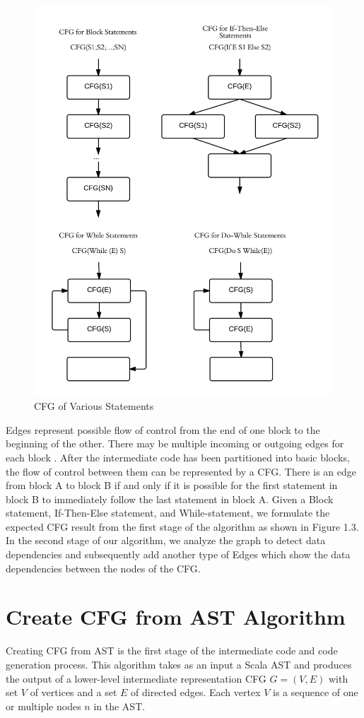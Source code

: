 \begin{figure}[h!]
\centering
\includegraphics[width=0.7\linewidth]{figures/Graph}
\caption{CFG of Various Statements}
\label{fig:Graph}
\end{figure}

Edges represent possible flow of control from the end of one block to the beginning of the other. There may be multiple incoming or outgoing edges for each block \cite{allen1970control}. After the intermediate code has been partitioned into basic blocks, the flow of control between them can be represented by a CFG. There is an edge from block A to block B if and only if it is possible for the first statement in block B to immediately follow the last statement in block A. Given a Block statement, If-Then-Else statement, and While-statement, we formulate the expected CFG result from the first stage of the algorithm as shown in Figure 1.3. In the second stage of our algorithm, we analyze the graph to detect data dependencies and subsequently add another type of Edges which show the data dependencies between the nodes of the CFG. 

\section{Create CFG from AST Algorithm}
Creating CFG from AST is the first stage of the intermediate code and code generation process. This algorithm takes as an input a Scala AST and produces the output of a lower-level intermediate representation CFG $G=(V,E)$ with set $V$ of vertices and a set $E$ of directed edges. Each vertex $V$ is a sequence of one or multiple nodes $n$ in the AST. 

